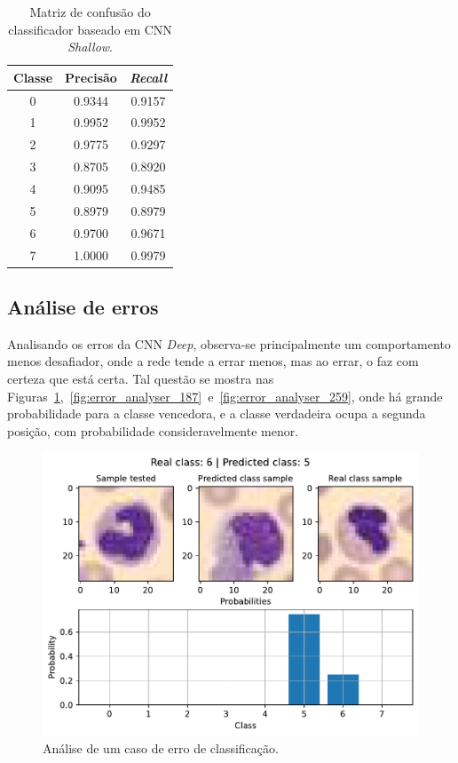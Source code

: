 \begin{table}[H]
	\centering
\begin{tabular}{c|c|c}
	\textbf{Classe} & \textbf{Precisão} & \textit{\textbf{Recall}} \\ \hline
	0               & 0.9344            & 0.9157                   \\
	1               & 0.9952            & 0.9952                   \\
	2               & 0.9775            & 0.9297                   \\
	3               & 0.8705            & 0.8920                   \\
	4               & 0.9095            & 0.9485                   \\
	5               & 0.8979            & 0.8979                   \\
	6               & 0.9700            & 0.9671                   \\
	7               & 1.0000            & 0.9979                  
\end{tabular}
	\caption{Matriz de confusão do classificador baseado em CNN \textit{Shallow}.}
	\label{tab:pr_CNN_deep}
\end{table}

\subsection{Análise de erros}

Analisando os erros da CNN \textit{Deep}, observa-se principalmente um comportamento menos desafiador, onde a rede tende a errar menos, mas ao errar, o faz com certeza que está certa. Tal questão se mostra nas Figuras~\ref{fig:error_analyser_8},~\ref{fig:error_analyser_187}~e~\ref{fig:error_analyser_259}, onde há grande probabilidade para a classe vencedora, e a classe verdadeira ocupa a segunda posição, com probabilidade consideravelmente menor.

\begin{figure}[H]
	\centering
	\includegraphics[width=0.75\linewidth]{../../plot/cnn_deep/error_analyser_8}
	\caption{Análise de um caso de erro de classificação.}
	\label{fig:error_analyser_8}
\end{figure}

